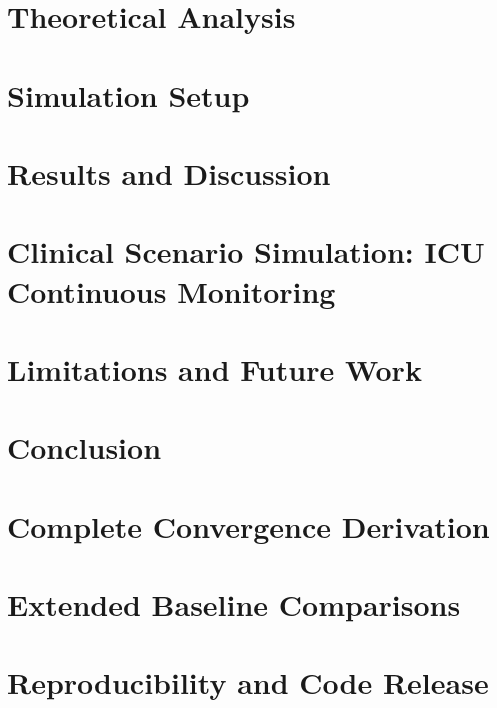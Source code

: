 \documentclass[journal,twoside,web]{IEEEtran}
\begin{document}
\section{Theoretical Analysis}

\section{Simulation Setup}

\section{Results and Discussion}

\section{Clinical Scenario Simulation: ICU Continuous Monitoring}

\section{Limitations and Future Work}

\section{Conclusion}

\appendices

\section{Complete Convergence Derivation}
\label{app:proof}

\section{Extended Baseline Comparisons}
\label{app:baselines}

\section{Reproducibility and Code Release}
\label{app:repro}
\end{document}
